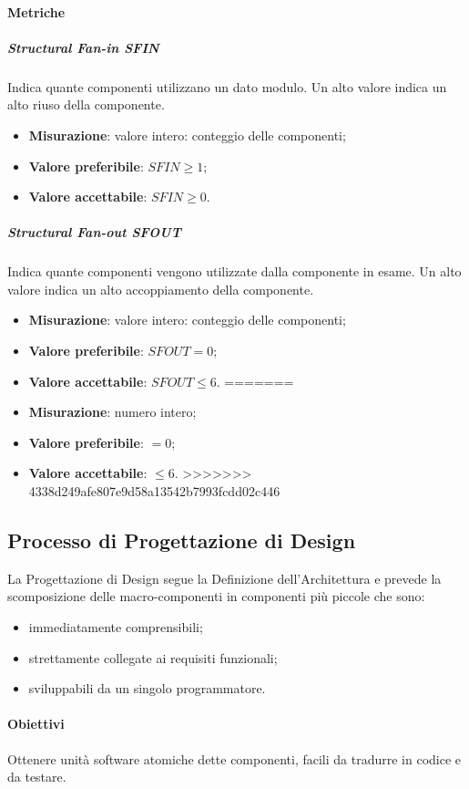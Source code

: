 		\paragraph{Metriche}
			\subparagraph{Structural Fan-in \textbf{SFIN}}
			Indica quante componenti utilizzano un dato modulo. Un alto valore indica un alto riuso della componente.
			\begin{itemize}
				\item \textbf{Misurazione}: valore intero: conteggio delle componenti;
				\item \textbf{Valore preferibile}: $SFIN \geq 1$;
				\item \textbf{Valore accettabile}: $SFIN \geq 0$.
			\end{itemize}
			\subparagraph{Structural Fan-out \textbf{SFOUT}}
			Indica quante componenti vengono utilizzate dalla componente in esame. Un alto valore indica un alto
accoppiamento della componente.
			\begin{itemize}
<<<<<<< HEAD
				\item \textbf{Misurazione}: valore intero: conteggio delle componenti;
				\item \textbf{Valore preferibile}: $SFOUT = 0$;
				\item \textbf{Valore accettabile}: $SFOUT \leq 6$.
=======
				\item \textbf{Misurazione}: numero intero;
				\item \textbf{Valore preferibile}: $=0$;
				\item \textbf{Valore accettabile}: $\leq6$.
>>>>>>> 4338d249afe807e9d58a13542b7993fcdd02c446
			\end{itemize}
			
	\subsection{Processo di Progettazione di Design}
	La Progettazione di Design segue la Definizione dell'Architettura e prevede la scomposizione delle macro-componenti in componenti più piccole che sono:
	\begin{itemize}
		\item immediatamente comprensibili;
		\item strettamente collegate ai requisiti funzionali;
		\item sviluppabili da un singolo programmatore.
	\end{itemize}
		\paragraph{Obiettivi}
			Ottenere unità software atomiche dette componenti, facili da tradurre in codice e da testare.
